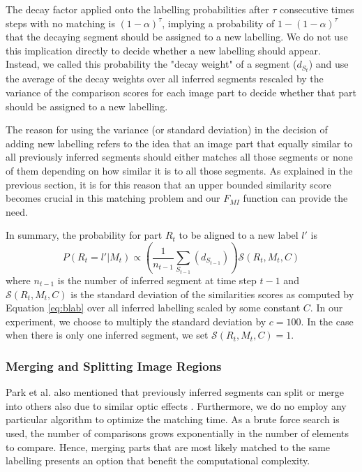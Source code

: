 \documentclass{article}
\begin{document}
The decay factor applied onto the labelling probabilities after $\tau$ consecutive times steps with no matching is $(1-\alpha)^{\tau}$, implying a probability of $1- (1-\alpha)^{\tau}$ that the decaying segment should be assigned to a new labelling. We do not use this implication directly to decide whether a new labelling should appear. Instead, we called this probability the "decay weight" of a segment ($d_{S_t}$) and use the average of the decay weights over all inferred segments rescaled by the variance of the comparison scores for each image part to decide whether that part should be assigned to a new labelling. 

The reason for using the variance (or standard deviation) in the decision of adding new labelling refers to the idea that an image part that equally similar to all previously inferred segments should either matches all those segments or none of them depending on how similar it is to all those segments. As explained in the previous section, it is for this reason that an upper bounded similarity score becomes crucial in this matching problem and our $F_{MI}$ function can provide the need. 

In summary, the probability for part $R_t$ to be aligned to a new label $l'$ is 
\begin{equation}
	P(R_t = l' | M_t) \propto \left(\frac{1}{n_{t-1}} \sum_{S_{t-1}}(d_{S_{t-1}})\right)\mathcal{S}(R_t, M_t, C)
\end{equation}
where $n_{t-1}$ is the number of inferred segment at time step $t-1$ and $\mathcal{S}(R_t, M_t, C)$ is the standard deviation of the similarities scores as computed by Equation \ref{eq:blab} over all inferred labelling scaled by some constant $C$. In our experiment, we choose to multiply the standard deviation by $c = 100$. In the case when there is only one inferred segment, we set $\mathcal{S}(R_t, M_t, C) = 1$. 

\subsubsection{Merging and Splitting Image Regions}

Park et al. also mentioned that previously inferred segments can split or merge into others also due to similar optic effects \cite{human-action}. Furthermore, we do no employ any particular algorithm to optimize the matching time. As a brute force search is used, the number of comparisons grows exponentially in the number of elements to compare. Hence, merging parts that are most likely matched to the same labelling presents an option that benefit the computational complexity. 
\end{document}
